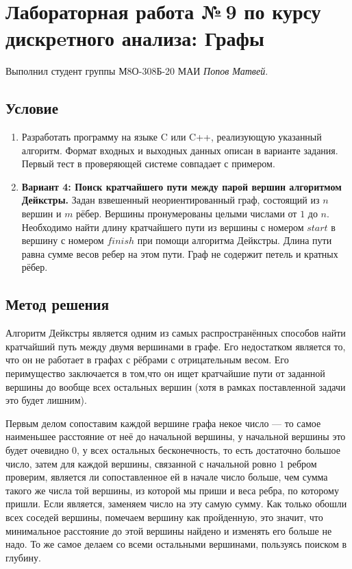 \documentclass[12pt]{article}
\begin{document}
    \section*{Лабораторная работа №\,9 по курсу дискрeтного анализа: 
    Графы}

    Выполнил студент группы М8О-308Б-20 МАИ \textit{Попов Матвей}.

    \subsection*{Условие}
 
    \begin{enumerate}
    \item Разработать программу на языке C или C++, реализующую указанный
    алгоритм. Формат входных и выходных данных описан в варианте задания.
    Первый тест в проверяющей системе совпадает с примером.
    \item \textbf{Вариант 4: Поиск кратчайшего пути между парой вершин
    алгоритмом Дейкстры.} Задан взвешенный неориентированный граф, состоящий 
    из $n$ вершин и $m$ рёбер. Вершины пронумерованы целыми числами от $1$ до 
    $n$. Необходимо найти длину кратчайшего пути из вершины с номером $start$ в 
    вершину с номером $finish$ при помощи алгоритма Дейкстры. Длина пути равна
    сумме весов ребер на этом пути. Граф не содержит петель и кратных рёбер.
    \end{enumerate}

    \subsection*{Метод решения}

    Алгоритм Дейкстры является одним из самых распространённых способов найти 
    кратчайший путь между двумя вершинами в графе. Его недостатком является то, 
    что он не работает в графах с рёбрами с отрицательным весом. Его 
    перимущество заключается в том,что он ищет кратчайшие пути от заданной 
    вершины до вообще всех остальных вершин (хотя в рамках поставленной задачи
    это будет лишним).

    Первым делом сопоставим каждой вершине графа некое число — то самое 
    наименьшее расстояние от неё до начальной вершины, у начальной вершины это 
    будет очевидно $0$, у всех остальных бесконечность, то есть достаточно 
    большое число, затем для каждой вершины, связанной с начальной ровно $1$ 
    ребром проверим, является ли сопоставленное ей в начале число больше, чем 
    сумма такого же числа той вершины, из которой мы приши и веса ребра, по 
    которому пришли. Если является, заменяем число на эту самую сумму. Как 
    только обошли всех соседей вершины, помечаем вершину как пройденную, это 
    значит, что минимальное расстояние до этой вершины найдено и изменять его 
    больше не надо. То же самое делаем со всеми остальными вершинами, пользуясь 
    поиском в глубину.
\end{document}
